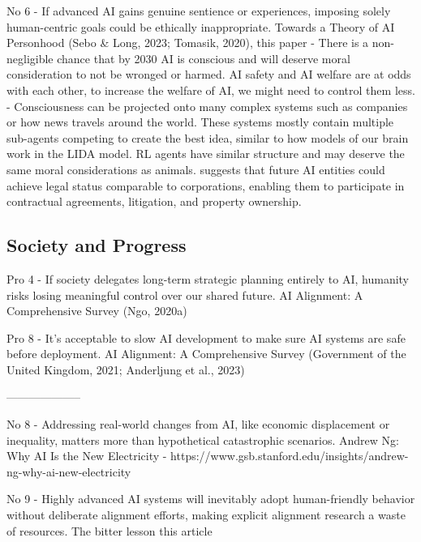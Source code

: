 No 6 - If advanced AI gains genuine sentience or experiences, imposing solely human-centric goals could be ethically inappropriate.
Towards a Theory of AI Personhood
(Sebo \& Long, 2023; Tomasik, 2020), this paper
\citep{sebo_moral_2025} - There is a non-negligible chance that by 2030 AI is conscious and will deserve moral consideration to not be wronged or harmed. AI safety and AI welfare are at odds with each other, to increase the welfare of AI, we might need to control them less.
\citep{tomasik_dialogue_2015} - Consciousness can be projected onto many complex systems such as companies or how news travels around the world. These systems mostly contain multiple sub-agents competing to create the best idea, similar to how models of our brain work in the LIDA model. RL agents have similar structure and may deserve the same moral considerations as animals.
\cite{ward_towards_2025} suggests that future AI entities could achieve legal status comparable to corporations, enabling them to participate in contractual agreements, litigation, and property ownership.


\subsection{Society and Progress}

Pro 4 - If society delegates long-term strategic planning entirely to AI, humanity risks losing meaningful control over our shared future.
AI Alignment: A Comprehensive Survey
(Ngo, 2020a)
\citep{ngo_agi_2020}

Pro 8 - It's acceptable to slow AI development to make sure AI systems are safe before deployment.
AI Alignment: A Comprehensive Survey
(Government of the United Kingdom, 2021; Anderljung et al., 2023)
\citep{government_of_the_united_kingdom_roadmap_2021}
\citep{anderljung_frontier_2023}

--------------------

No 8 - Addressing real-world changes from AI, like economic displacement or inequality, matters more than hypothetical catastrophic scenarios.
Andrew Ng: Why AI Is the New Electricity - https://www.gsb.stanford.edu/insights/andrew-ng-why-ai-new-electricity
\citep{ng_andrew_2017}

No 9 - Highly advanced AI systems will inevitably adopt human-friendly behavior without deliberate alignment efforts, making explicit alignment research a waste of resources.
The bitter lesson
this article
\citep{sutton_bitter_2019}

